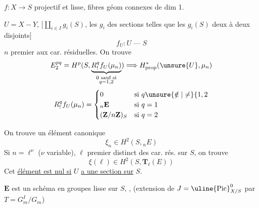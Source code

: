 $f:X\longrightarrow S$ projectif et lisse, fibres géom connexes de dim 1.

$U=X-Y$,  $[\coprod_{i\in I}g_i(S)$, les $g_i$ des sections telles que les $g_i(S)$ deux à deux disjoints$]$
\[
f_U:U\mathbin{\text{---}}S
\]
$n$ premier aux car. résiduelles. On trouve
\[
E_2^{pq}=H^p(S,\underbrace{R^q_!f_U(\mu_n)}_{\substack{0\text{ sauf si}\\q=1,2}})\Longrightarrow H^*_{\mathrm{prop}}(\unsure{U},\mu_n)
\]
\[
R^q_!f_U(\mu_n)=\begin{cases}
0&\text{si }q\unsure{\notin|\ne}\{1,2\\
{}_n\mathbf E&\text{si }q=1\\
(\mathbf Z/n\mathbf Z)_S&\text{si }q=2
\end{cases}
\]

On trouve un élément canonique
\[
\xi_n\in H^2(S,{}_n E)
\]
Si $n=\ell^\nu$ ($\nu$ variable), $\ell$ premier distinct des car. rés. sur $S$, on trouve
\[
\boxed{\xi(\ell)\in H^2(S,\mathbf T_\ell(E))}
\]
Cet \uline{élément est nul si} $U$ \uline{a une section sur} $S$.

$\mathbf E$ est un schéma en groupes lisse sur $S$, , (extension de $J=\uline{\mathrm{Pic}}^0_{X/S}$ par $T=G_m^I/G_m$)

